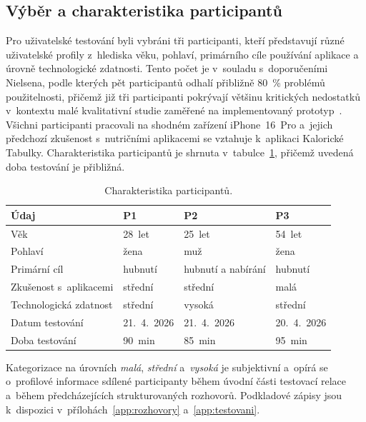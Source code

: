 \subsection{Výběr a charakteristika participantů}
\label{subsec:vyberParticipantu}

Pro uživatelské testování byli vybráni tři participanti, kteří představují různé uživatelské profily z~hlediska věku, pohlaví, primárního cíle používání aplikace a úrovně technologické zdatnosti.
Tento počet je v~souladu s~doporučeními Nielsena, podle kterých pět participantů odhalí přibližně 80~\% problémů použitelnosti, přičemž již tři participanti pokrývají většinu kritických nedostatků v~kontextu malé kvalitativní studie zaměřené na implementovaný prototyp~\cite{nielsen2000fiveUsers}.
Všichni participanti pracovali na shodném zařízení iPhone~16~Pro a~jejich předchozí zkušenost s~nutričními aplikacemi se vztahuje k~aplikaci Kalorické Tabulky.
Charakteristika participantů je shrnuta v~tabulce~\ref{tab:participantiTesting}, přičemž uvedená doba testování je přibližná.

\begin{table}[ht]
	\centering
	\caption{Charakteristika participantů.}
	\label{tab:participantiTesting}
	\small
	\setlength{\tabcolsep}{4pt}
	\begin{threeparttable}
	\begin{tabular}{p{3.5cm}p{2.8cm}p{2.8cm}p{2.5cm}}
		\toprule
		\textbf{Údaj} & \textbf{P1} & \textbf{P2} & \textbf{P3} \\
		\midrule
		Věk & 28~let & 25~let & 54~let \\
		Pohlaví & žena & muž & žena \\
		Primární cíl & hubnutí & hubnutí a nabírání & hubnutí \\
		Zkušenost s~aplikacemi\tnote{1} & střední & střední & malá \\
		Technologická zdatnost\tnote{1} & střední & vysoká & střední \\
		Datum testování & 21.~4.~2026 & 21.~4.~2026 & 20.~4.~2026 \\
		Doba testování & 90~min & 85~min & 95~min \\
		\bottomrule
	\end{tabular}
	\begin{tablenotes}[flushleft]
		\footnotesize
		\item[1] Kategorizace na úrovních \emph{malá}, \emph{střední} a~\emph{vysoká} je subjektivní a~opírá se o~profilové informace sdílené participanty během úvodní části testovací relace a~během předcházejících strukturovaných rozhovorů. Podkladové zápisy jsou k~dispozici v~přílohách~\ref{app:rozhovory} a~\ref{app:testovani}.
	\end{tablenotes}
	\end{threeparttable}
\end{table}

